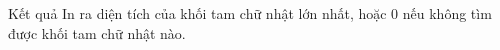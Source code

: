 Kết quả
In ra diện tích của khối tam chữ nhật lớn nhất, hoặc 0 nếu không tìm được khối tam chữ nhật nào.